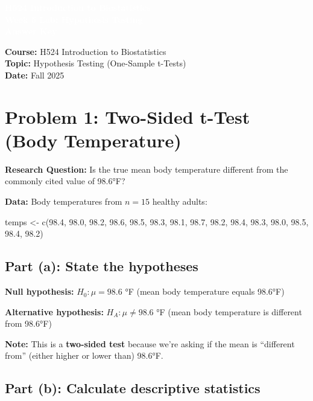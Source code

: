 \documentclass[11pt]{article}
\title{}
\author{}
\date{}
\begin{document}
\begin{tcolorbox}[colback=osaorange,colframe=black,boxrule=2pt,arc=0pt,left=3pt,right=3pt,top=6pt,bottom=6pt,boxsep=2pt]
\centering
\textcolor{white}{\textbf{\Large H524 Introduction to Biostatistics}}\\
\textcolor{white}{\textbf{\Large Week 5 Lab: Hypothesis Testing}}\\
\textcolor{white}{\textbf{\Large Answer Key}}
\end{tcolorbox}

\vspace{12pt}

\noindent\textbf{Course:} H524 Introduction to Biostatistics\\
\textbf{Topic:} Hypothesis Testing (One-Sample t-Tests)\\
\textbf{Date:} Fall 2025

\vspace{12pt}

\section*{Problem 1: Two-Sided t-Test (Body Temperature)}

\textbf{Research Question:} Is the true mean body temperature different from the commonly cited value of 98.6°F?

\textbf{Data:} Body temperatures from $n = 15$ healthy adults:
\begin{rcode}
temps <- c(98.4, 98.0, 98.2, 98.6, 98.5, 98.3, 98.1, 98.7,
           98.2, 98.4, 98.3, 98.0, 98.5, 98.4, 98.2)
\end{rcode}

\subsection*{Part (a): State the hypotheses}

\textbf{Null hypothesis:} $H_0: \mu = 98.6$ °F (mean body temperature equals 98.6°F)

\textbf{Alternative hypothesis:} $H_A: \mu \neq 98.6$ °F (mean body temperature is different from 98.6°F)

\textbf{Note:} This is a \textbf{two-sided test} because we're asking if the mean is ``different from'' (either higher or lower than) 98.6°F.

\subsection*{Part (b): Calculate descriptive statistics}
\end{document}
